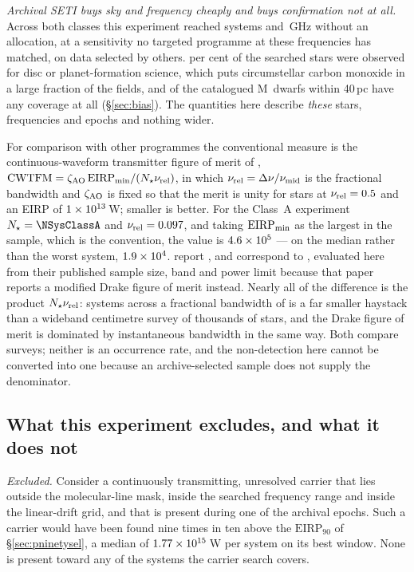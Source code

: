\emph{Archival SETI buys sky and frequency cheaply and buys confirmation not
at all.} Across both classes this experiment reached \NSystems{} systems and
\UnionGHz\,GHz without an allocation, at a sensitivity no targeted programme
at these frequencies has matched, on data selected by others.
\PctDiscProposal{} per cent of the searched stars were observed for disc or
planet-formation science, which puts circumstellar carbon monoxide in a large
fraction of the fields, and \SfMSearched{} of the \SfMCensus{} catalogued
M~dwarfs within 40\,pc have any coverage at all
(\S\ref{sec:bias}). The quantities here describe
\emph{these} stars, frequencies and epochs and nothing wider.

For comparison with other programmes the conventional measure is the
continuous-waveform transmitter figure of merit of \citet{Enriquez2017},
$\mathrm{CWTFM}=\zeta_{\rm AO}\,\mathrm{EIRP}_{\rm min}/
(N_{\star}\nu_{\rm rel})$, in which $\nu_{\rm rel}=\Delta\nu/\nu_{\rm mid}$ is
the fractional bandwidth and $\zeta_{\rm AO}$ is fixed so that the merit is
unity for \FomNormN{} stars at $\nu_{\rm rel}=0.5$ and an EIRP of
$1\times10^{13}$\,W; smaller is better. For the Class~A experiment
$N_{\star}=\NSysClassA$ and $\nu_{\rm rel}=0.097$, and taking
$\mathrm{EIRP}_{\rm min}$ as the largest in the sample, which is the
convention, the value is $4.6\times10^{5}$ --- on the median rather than the
worst system, $1.9\times10^{4}$. \citet{Enriquez2017} report \FomLitEnriquez,
and \citet{Margot2023} correspond to \FomLitMargot, evaluated here from their
published sample size, band and power limit because that paper reports a
modified Drake figure of merit instead. Nearly all of the difference is the
product $N_{\star}\nu_{\rm rel}$: \NSysClassA{} systems across a fractional
bandwidth of \FomNuRel{} is a far smaller haystack than a wideband centimetre
survey of thousands of stars, and the Drake figure of merit is dominated by
instantaneous bandwidth in the same way. Both compare surveys; neither is an
occurrence rate, and the non-detection here cannot be converted into one
because an archive-selected sample does not supply the denominator.

\subsection{What this experiment excludes, and what it does not}
\label{sec:excludes}

\noindent\emph{Excluded.} Consider a continuously transmitting, unresolved
carrier that lies outside the molecular-line mask, inside the searched
frequency range and inside the linear-drift grid, and that is present during
one of the archival epochs. Such a carrier would have been found nine times
in ten above the $\mathrm{EIRP}_{90}$ of \S\ref{sec:pninetysel}, a median of
$1.77\times10^{15}$\,W per system on its best window. None is present toward
any of the \NSysClassA{} systems the carrier search covers.

